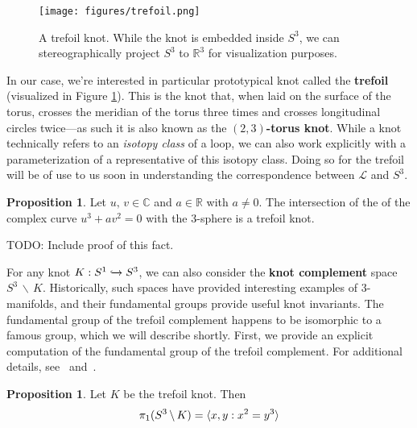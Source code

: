 \documentclass[12pt,twoside]{reedthesis}
\theoremstyle{definition}
\newtheorem{prop}[thm]{Proposition}
\newcommand{\R}{\mathbb{R}}
\newcommand{\C}{\mathbb{C}}
\newcommand{\LS}{\mathcal{L}}
\newcommand{\into}{\xhookrightarrow{}}
\newcommand{\wo}{\, \backslash \,}
\newcommand{\TODO}[1]{{\color{todopink}\textsf{TODO: #1}}}
\newcommand{\defnphrase}[1]{\textbf{#1}}
\DeclarePairedDelimiter\ang{\langle}{\rangle}
\begin{document}
\begin{figure}[h]
  \centering
  \texttt{[image: figures/trefoil.png]}
  \caption{A trefoil knot. While the knot is embedded inside $S^3$, we can stereographically project $S^3$ to $\R^3$ for visualization purposes.}
  \label{fig:trefoil}
\end{figure}

In our case, we're interested in particular prototypical knot called the \defnphrase{trefoil} (visualized in Figure \ref{fig:trefoil}).
This is the knot that, when laid on the surface of the torus, crosses the meridian of the torus three times and crosses longitudinal circles twice---as such it is also known as the \defnphrase{$(2, 3)$-torus knot}.
While a knot technically refers to an \emph{isotopy class} of a loop, we can also work explicitly with a parameterization of a representative of this isotopy class.
Doing so for the trefoil will be of use to us soon in understanding the correspondence between $\LS$ and $S^3$.

\begin{prop}\label{prop:trefoil_intersection_curve}
  Let $u,\, v \in \C$ and $a \in \R$ with $a \neq 0$.
  The intersection of the of the complex curve $u^3 + a v^2 = 0$ with the 3-sphere is a trefoil knot.
\end{prop}

\TODO{Include proof of this fact.}

For any knot $K : S^1 \into S^3$, we can also consider the \defnphrase{knot complement} space $S^3 \wo K$.
Historically, such spaces have provided interesting examples of 3-manifolds, and their fundamental groups provide useful knot invariants.
The fundamental group of the trefoil complement happens to be isomorphic to a famous group, which we will describe shortly.
First, we provide an explicit computation of the fundamental group of the trefoil complement.
For additional details, see~\cite[47--49]{hatcher2002} and~\cite[153--154]{stillwell1993}.

\begin{prop}
  Let $K$ be the trefoil knot.
  Then
  \begin{equation*}
    \pi_1(S^3 \wo K) = \ang{x, y : x^2 = y^3}
  \end{equation*}
\end{prop}
\end{document}

